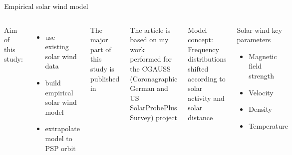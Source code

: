 \begin{frame}[plain,c]{Empirical solar wind model}{}
	\begin{columns}[c]
		
		Aim of this study:
		\begin{itemize}
			\item use existing solar wind data
			\item build empirical solar wind model
			\item extrapolate model to PSP orbit
		\end{itemize}
		\vspace{1cm}
		The major part of this study is published in \citet{Venzmer2018}\\\ 
		
		The article is based on my work performed for the CGAUSS (Coronagraphic German and US SolarProbePlus Survey) project

		
		Model concept:\\
		Frequency distributions shifted according to solar activity and solar distance\\
		\begin{block}{Solar wind key parameters}
			\begin{itemize}
				\item Magnetic field strength
				\item Velocity
				\item Density
				\item Temperature
			\end{itemize}
		\end{block}
		
	\end{columns}
\end{frame}

